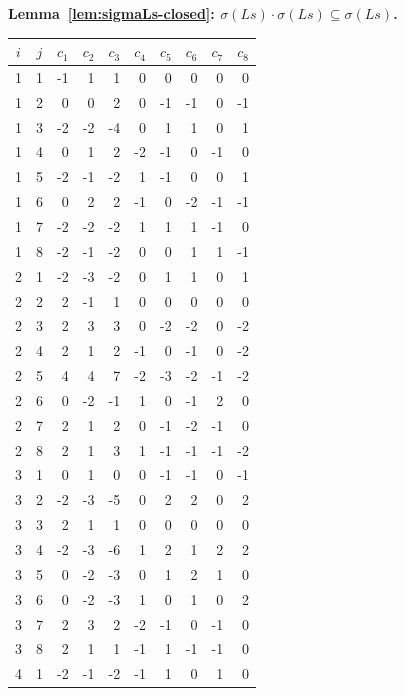 \documentclass[twoside,english]{paper}
\numberwithin{equation}{section}
\numberwithin{figure}{section}
\theoremstyle{definition}
\theoremstyle{remark}
\begin{document}
\begin{table}[H]
\centering
{\bfseries Lemma~\ref{lem:sigmaLs-closed}: $\sigma(Ls) \cdot \sigma(Ls) \subseteq \sigma(Ls)$.}\par\medskip
\footnotesize
\setlength{\tabcolsep}{4pt}
\begin{minipage}[t]{0.48\textwidth}
\centering
\begin{tabular}{cc|rrrrrrrr}
\toprule
$i$ & $j$ & $c_1$ & $c_2$ & $c_3$ & $c_4$ & $c_5$ & $c_6$ & $c_7$ & $c_8$ \\
\midrule
1 & 1 & -1 & 1 & 1 & 0 & 0 & 0 & 0 & 0 \\
1 & 2 & 0 & 0 & 2 & 0 & -1 & -1 & 0 & -1 \\
1 & 3 & -2 & -2 & -4 & 0 & 1 & 1 & 0 & 1 \\
1 & 4 & 0 & 1 & 2 & -2 & -1 & 0 & -1 & 0 \\
1 & 5 & -2 & -1 & -2 & 1 & -1 & 0 & 0 & 1 \\
1 & 6 & 0 & 2 & 2 & -1 & 0 & -2 & -1 & -1 \\
1 & 7 & -2 & -2 & -2 & 1 & 1 & 1 & -1 & 0 \\
1 & 8 & -2 & -1 & -2 & 0 & 0 & 1 & 1 & -1 \\
\midrule
2 & 1 & -2 & -3 & -2 & 0 & 1 & 1 & 0 & 1 \\
2 & 2 & 2 & -1 & 1 & 0 & 0 & 0 & 0 & 0 \\
2 & 3 & 2 & 3 & 3 & 0 & -2 & -2 & 0 & -2 \\
2 & 4 & 2 & 1 & 2 & -1 & 0 & -1 & 0 & -2 \\
2 & 5 & 4 & 4 & 7 & -2 & -3 & -2 & -1 & -2 \\
2 & 6 & 0 & -2 & -1 & 1 & 0 & -1 & 2 & 0 \\
2 & 7 & 2 & 1 & 2 & 0 & -1 & -2 & -1 & 0 \\
2 & 8 & 2 & 1 & 3 & 1 & -1 & -1 & -1 & -2 \\
\midrule
3 & 1 & 0 & 1 & 0 & 0 & -1 & -1 & 0 & -1 \\
3 & 2 & -2 & -3 & -5 & 0 & 2 & 2 & 0 & 2 \\
3 & 3 & 2 & 1 & 1 & 0 & 0 & 0 & 0 & 0 \\
3 & 4 & -2 & -3 & -6 & 1 & 2 & 1 & 2 & 2 \\
3 & 5 & 0 & -2 & -3 & 0 & 1 & 2 & 1 & 0 \\
3 & 6 & 0 & -2 & -3 & 1 & 0 & 1 & 0 & 2 \\
3 & 7 & 2 & 3 & 2 & -2 & -1 & 0 & -1 & 0 \\
3 & 8 & 2 & 1 & 1 & -1 & 1 & -1 & -1 & 0 \\
\midrule
4 & 1 & -2 & -1 & -2 & -1 & 1 & 0 & 1 & 0 \\

\end{tabular}
\end{minipage}
\end{table}
\end{document}
